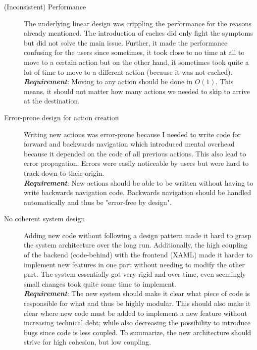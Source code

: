\begin{description}
\item [(Inconsistent) Performance] The underlying linear design was crippling the performance for the reasons already mentioned. The introduction of caches did only fight the symptoms but did not solve the main issue. Further, it made the performance confusing for the users since sometimes, it took close to no time at all to move to a certain action but on the other hand, it sometimes took quite a lot of time to move to a different action (because it was not cached). \\
\textit{\textbf{Requirement}}: Moving to any action should be done in $O(1)$. This means, it should not matter how many actions we needed to skip to arrive at the destination.
\item [Error-prone design for action creation] Writing new actions was error-prone because I needed to write code for forward and backwards navigation which introduced mental overhead because it depended on the code of all previous actions. This also lead to error propagation. Errors were easily noticeable by users but were hard to track down to their origin.\\
\textit{\textbf{Requirement}}: New actions should be able to be written without having to write backwards navigation code. Backwards navigation should be handled automatically and thus be "error-free by design".
\item [No coherent system design] Adding new code without following a design pattern made it hard to grasp the system architecture over the long run. Additionally, the high coupling of the backend (code-behind) with the frontend (XAML) made it harder to implement new features in one part without needing to modify the other part. The system essentially got very rigid and over time, even seemingly small changes took quite some time to implement.\\
\textit{\textbf{Requirement}}: The new system should make it clear what piece of code is responsible for what and thus be highly modular. This should also make it clear where new code must be added to implement a new feature without increasing technical debt; while also decreasing the possibility to introduce bugs since code is less coupled. To summarize, the new architecture should strive for high cohesion, but low coupling.
\end{description}
